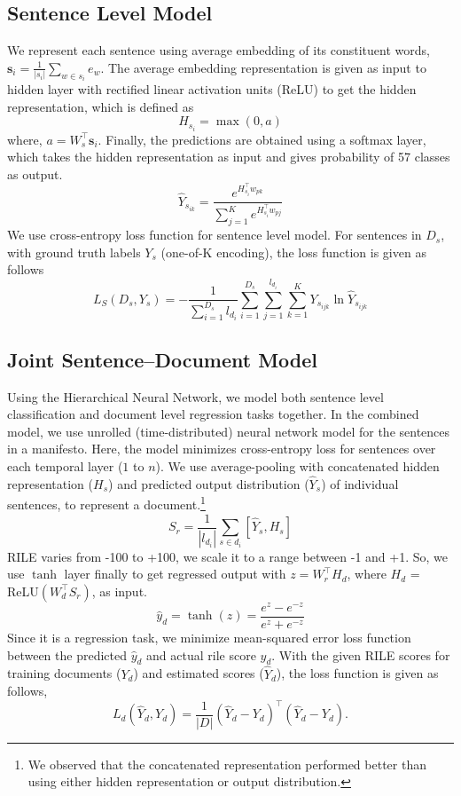 \documentclass[11pt,a4paper]{article}
\begin{document}
\subsection{Sentence Level Model}
We represent each sentence using average embedding of its constituent words, $ \bm{s}_{i} = \frac{1}{|s_{i}|}\sum_{w \in s_{i}} e_{w}$.
The average embedding representation is given as input to hidden layer with rectified linear activation units (ReLU) to get the hidden representation, which is defined as \[H_{s_{i}}= \max(0,a)\] where, $a = W_{s}^\top \bm{s}_{i}$. Finally, the predictions are obtained using a softmax layer, which takes the hidden representation as input and gives probability of 57 classes as output.
\[ \hat{Y}_{s_{ik}} = \frac{e^{H_{s_{i}}^\top w_{pk}}}{\sum_{j=1}^{K}{e^{H_{s_{i}}^\top w_{pj}}}}\]
We use cross-entropy loss function for sentence level model. For sentences in $D_{s}$, with ground truth labels $Y_{s}$ (one-of-K encoding), the loss function is given as follows
\begin{equation}
L_{S}(D_{s},Y_{s})=-\frac{1}{\sum_{i=1}^{D_{s}}l_{d_{i}}}\sum_{i=1}^{D_{s}}\sum_{j=1}^{l_{d_{i}}}\sum_{k=1}^{K} Y_{s_{ijk}} \ln \hat{Y}_{s_{ijk}}  
\end{equation}
\subsection{Joint Sentence--Document Model}
Using the Hierarchical Neural Network, we model both sentence level classification and document level regression tasks together. In the combined model, we use unrolled (time-distributed) neural network model for the sentences in a manifesto. Here, the model minimizes cross-entropy loss for sentences over each temporal layer ($1$ to $n$). We use average-pooling with concatenated hidden representation ($H_{s}$) and predicted output distribution ($\hat{Y}_{s}$) of individual sentences, to represent a document.\footnote{We observed that the concatenated representation performed better than using either hidden representation or output distribution.}
\[ S_{r} = \frac{1}{|l_{d_{i}}|}\sum_{s \in d_{i}} [\hat{Y}_{s}, H_{s}] \]
RILE varies from -100 to +100, we scale it to a range between -1 and +1. So, we use $\tanh$ layer finally to get regressed output with $z = W_{r}^\top H_{d}$, where $H_{d}$ = ReLU$(W_{d}^\top S_{r})$, as input.
\[ \hat{y}_{d} = \tanh(z) = \frac{e^z - e^{-z}}{e^z + e^{-z}} \]
Since it is a regression task, we minimize mean-squared error loss function between the predicted $\hat{y}_{d}$ and actual rile score $y_{d}$. With the given RILE scores for training documents ($Y_{d}$) and estimated scores ($\hat{Y}_{d}$), the loss function is given as follows,
\begin{equation}
L_{d}(\hat{Y}_{d}, Y_{d}) = \frac{1}{|D|}  (\hat{Y}_{d} - Y_{d})^\top (\hat{Y}_{d} - Y_{d}).
\end{equation}
\end{document}
